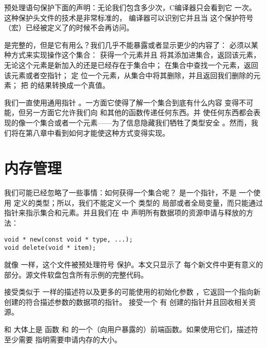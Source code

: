预处理语句保护下面的声明：无论我们包含多少次，C编译器只会看到它
一次。这种保护头文件的技术是非常标准的， 编译器可以识别它并且当
这个保护符号（宏）已经被定义了的时候不会再访问。

 是完整的，但是它有用么？我们几乎不能暴露或者显示更少的内容了：
 必须以某种方式来实现操作这个集合： 获得一个元素并且
将其添加进集合，返回该元素，无论这个元素是新加入的还是已经存在于集合中；
 在集合中查找一个元素，返回该元素或者空指针； 定
位一个元素，从集合中将其删除，并且返回我们删除的元素； 把
 的结果转换成一个真值。

我们一直使用通用指针 。一方面它使得了解一个集合到底有什么内容
变得不可能，但另一方面它允许我们向 和其他的函数传递任何东西。并
使任何东西都会表现的像一个集合或者一个元素——为了信息隐藏我们牺牲了类型安全
。然而，我们将在第八章中看到如何才能使这种方式变得实现。

\section{内存管理}
我们可能已经忽略了一些事情：如何获得一个集合呢？ 是一个指针，不是
一个使用  定义的类型；所以，我们不能定义一个 类型的
局部或者全局变量，而只能通过指针来指示集合和元素。并且我们在 中
声明所有数据项的资源申请与释放的方法：
\begin{lstlisting}
void * new(const void * type, ...);
void delete(void * item);
\end{lstlisting}
就像 一样，这个文件被预处理符号 保护。本文只显示了
每个新文件中更有意义的部分。源文件软盘包含所有示例的完整代码。

 接受类似于 一样的描述符以及更多的可能使用的初始化参数
，它返回一个指向新创建的符合描述参数的数据项的指针。 接受一个
有 创建的指针并且回收相关资源。

 和 大体上是 函数
和 的一个（向用户暴露的）前端函数。如果使用它们，描述符至少需要
指明需要申请内存的大小。

